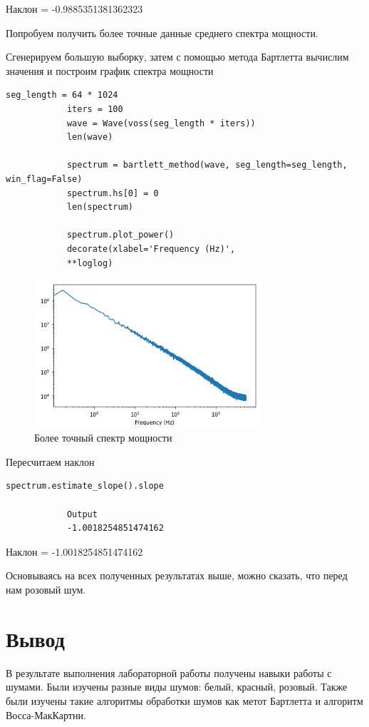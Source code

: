 \documentclass[a4paper,12pt]{article}
\begin{document}
\begin{enumerate}
		Наклон = -0.9885351381362323
		
		Попробуем получить более точные данные среднего спектра мощности.
		
		Сгенерируем большую выборку, затем с помощью метода Бартлетта вычислим значения и построим график спектра мощности
		\begin{lstlisting}[caption=Уточнение результата]
			seg_length = 64 * 1024
			iters = 100
			wave = Wave(voss(seg_length * iters))
			len(wave)
			
			spectrum = bartlett_method(wave, seg_length=seg_length, win_flag=False)
			spectrum.hs[0] = 0
			len(spectrum)
			
			spectrum.plot_power()
			decorate(xlabel='Frequency (Hz)',
			**loglog)
		\end{lstlisting}
		\begin{figure}[H]
			\centering
			\includegraphics[width=0.75\textwidth]{5_3.png}
			\caption{Более точный спектр мощности}
			\label{fig:5.3}
		\end{figure}
		
		Пересчитаем наклон
		\begin{lstlisting}[caption=Пересчитывание наклона]
			spectrum.estimate_slope().slope
			
			Output
			-1.0018254851474162
		\end{lstlisting}
		
		Наклон = -1.0018254851474162
		
		Основываясь на всех полученных результатах выше, можно сказать, что перед нам розовый шум.
		
	\end{enumerate}
	\newpage
	
	
	\section{Вывод}
	
	В результате выполнения лабораторной работы получены навыки работы с шумами. Были изучены разные виды шумов: белый, красный, розовый. Также были изучены такие алгоритмы обработки шумов как метот Бартлетта и алгоритм Восса-МакКартни.
\end{document}
